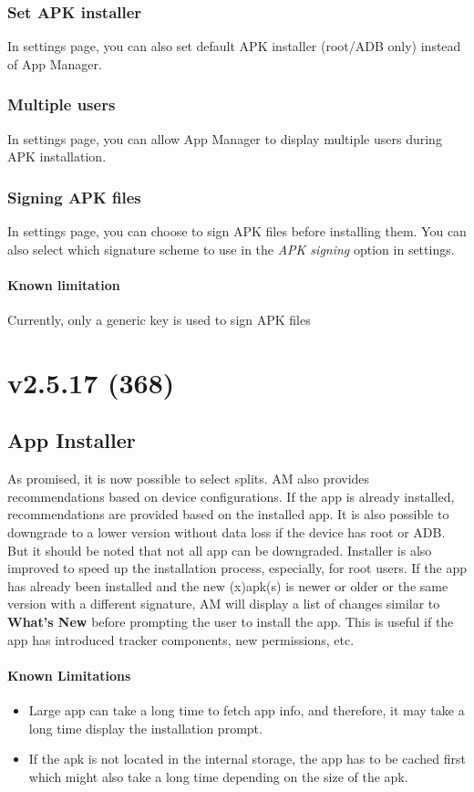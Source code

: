 \subsubsection{Set APK installer}
In settings page, you can also set default APK installer (root/ADB only) instead of App Manager.

\subsubsection{Multiple users}
In settings page, you can allow App Manager to display multiple users during APK installation.

\subsubsection{Signing APK files}
In settings page, you can choose to sign APK files before installing them. You can also select which signature scheme
to use in the \textit{APK signing} option in settings.

\paragraph{Known limitation} Currently, only a generic key is used to sign APK files


\section{v2.5.17 (368)}

\subsection{App Installer}
As promised, it is now possible to select splits. AM also provides recommendations based on device configurations.
If the app is already installed, recommendations are provided based on the installed app. It is also possible to
downgrade to a lower version without data loss if the device has root or ADB. But it should be noted that not all app
can be downgraded. Installer is also improved to speed up the installation process, especially, for root users.
If the app has already been installed and the new (x)apk(s) is newer or older or the same version with a different
signature, AM will display a list of changes similar to \textbf{What's New} before prompting the user to install
the app. This is useful if the app has introduced tracker components, new permissions, etc.

\paragraph{Known Limitations}
\begin{itemize}
    \item Large app can take a long time to fetch app info, and therefore, it may take a long time display the installation prompt.
    \item If the apk is not located in the internal storage, the app has to be cached first which might also take
    a long time depending on the size of the apk.
\end{itemize}

